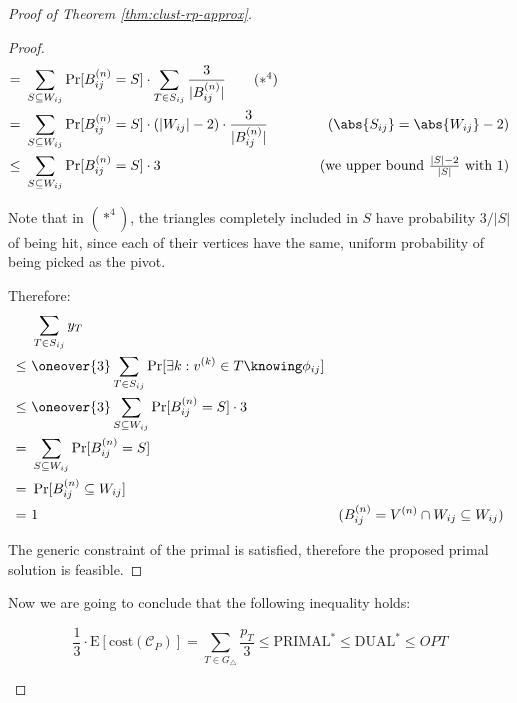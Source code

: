 \begin{proof}[Proof of Theorem \ref{thm:clust-rp-approx}]
\begin{proof}
\begin{align*}
               =&\ \sum_{S \subseteq W_{ij}} \Pr[B^{(n)}_{ij} = S] \cdot \sum_{T \in S_{ij}} \frac{3}{|B^{(n)}_{ij}|} \tag{$*^4$} & \\
               =&\ \sum_{S \subseteq W_{ij}} \Pr[B^{(n)}_{ij} = S] \cdot (|W_{ij}| - 2) \cdot \frac{3}{|B^{(n)}_{ij}|} & (\abs{S_{ij}} = \abs{W_{ij}} - 2)\\
            \leq&\ \sum_{S \subseteq W_{ij}} \Pr[B^{(n)}_{ij} = S] \cdot 3 & \tag{we upper bound $\frac{|S|-2}{|S|}$ with 1} \\
        \end{align*}

        
        Note that in $(*^4)$, the triangles completely included in $S$ have probability $3/|S|$ of being hit, since each of their vertices have the same, uniform probability of being picked as the pivot.

        Therefore:
        \begin{align*}
                &\ \sum_{T \in S_{ij}} y_T                                                           & \\
            \leq&\ \oneover{3} \sum_{T \in S_{ij}} \Pr[\exists k : v^{(k)} \in T \knowing \phi_{ij}] & \\
            \leq&\ \oneover{3} \sum_{S \subseteq W_{ij}} \Pr[B^{(n)}_{ij} = S] \cdot 3 & \\
               =&\ \sum_{S \subseteq W_{ij}} \Pr[B^{(n)}_{ij} = S] & \\
               =&\ \Pr[B^{(n)}_{ij} \subseteq W_{ij}] & \\
               =&\ 1 & (B^{(n)}_{ij} = V^{(n)} \cap W_{ij} \subseteq W_{ij}) \\
        \end{align*}
        
        The generic constraint of the primal is satisfied, therefore the proposed primal solution is feasible.
    \end{proof}




    Now we are going to conclude that the following inequality holds:
    \begin{claim}\label{cl:clust-ineq}
        \begin{equation}\label{eq:clust-ineq}
            \frac13 \cdot \text{E}[\text{cost}(\mathscr{C}_P)] =  \sum_{T \in G_\triangle} \frac{p_T}{3} \leq \text{PRIMAL}^* \leq \text{DUAL}^* \leq OPT
        \end{equation}
    \end{claim}


\end{proof}
